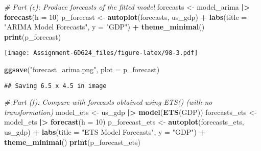 \documentclass[
]{article}
\newenvironment{Shaded}{\begin{snugshade}}{\end{snugshade}}
\newcommand{\AttributeTok}[1]{\textcolor[rgb]{0.13,0.29,0.53}{#1}}
\newcommand{\CommentTok}[1]{\textcolor[rgb]{0.56,0.35,0.01}{\textit{#1}}}
\newcommand{\DecValTok}[1]{\textcolor[rgb]{0.00,0.00,0.81}{#1}}
\newcommand{\FunctionTok}[1]{\textcolor[rgb]{0.13,0.29,0.53}{\textbf{#1}}}
\newcommand{\NormalTok}[1]{#1}
\newcommand{\OtherTok}[1]{\textcolor[rgb]{0.56,0.35,0.01}{#1}}
\newcommand{\SpecialCharTok}[1]{\textcolor[rgb]{0.81,0.36,0.00}{\textbf{#1}}}
\newcommand{\StringTok}[1]{\textcolor[rgb]{0.31,0.60,0.02}{#1}}
\begin{document}
\begin{Shaded}
\begin{Highlighting}[]
\CommentTok{\# Part (e): Produce forecasts of the fitted model}
\NormalTok{forecasts }\OtherTok{\textless{}{-}}\NormalTok{ model\_arima }\SpecialCharTok{|\textgreater{}} \FunctionTok{forecast}\NormalTok{(}\AttributeTok{h =} \DecValTok{10}\NormalTok{)}
\NormalTok{p\_forecast }\OtherTok{\textless{}{-}} \FunctionTok{autoplot}\NormalTok{(forecasts, us\_gdp) }\SpecialCharTok{+}
  \FunctionTok{labs}\NormalTok{(}\AttributeTok{title =} \StringTok{"ARIMA Model Forecasts"}\NormalTok{, }\AttributeTok{y =} \StringTok{"GDP"}\NormalTok{) }\SpecialCharTok{+}
  \FunctionTok{theme\_minimal}\NormalTok{()}
\FunctionTok{print}\NormalTok{(p\_forecast)}
\end{Highlighting}
\end{Shaded}

\texttt{[image: Assignment-6D624\_files/figure-latex/98-3.pdf]}

\begin{Shaded}
\begin{Highlighting}[]
\FunctionTok{ggsave}\NormalTok{(}\StringTok{"forecast\_arima.png"}\NormalTok{, }\AttributeTok{plot =}\NormalTok{ p\_forecast)}
\end{Highlighting}
\end{Shaded}

\begin{verbatim}
## Saving 6.5 x 4.5 in image
\end{verbatim}

\begin{Shaded}
\begin{Highlighting}[]
\CommentTok{\# Part (f): Compare with forecasts obtained using ETS() (with no transformation)}
\NormalTok{model\_ets }\OtherTok{\textless{}{-}}\NormalTok{ us\_gdp }\SpecialCharTok{|\textgreater{}} \FunctionTok{model}\NormalTok{(}\FunctionTok{ETS}\NormalTok{(GDP))}
\NormalTok{forecasts\_ets }\OtherTok{\textless{}{-}}\NormalTok{ model\_ets }\SpecialCharTok{|\textgreater{}} \FunctionTok{forecast}\NormalTok{(}\AttributeTok{h =} \DecValTok{10}\NormalTok{)}
\NormalTok{p\_forecast\_ets }\OtherTok{\textless{}{-}} \FunctionTok{autoplot}\NormalTok{(forecasts\_ets, us\_gdp) }\SpecialCharTok{+}
  \FunctionTok{labs}\NormalTok{(}\AttributeTok{title =} \StringTok{"ETS Model Forecasts"}\NormalTok{, }\AttributeTok{y =} \StringTok{"GDP"}\NormalTok{) }\SpecialCharTok{+}
  \FunctionTok{theme\_minimal}\NormalTok{()}
\FunctionTok{print}\NormalTok{(p\_forecast\_ets)}
\end{Highlighting}
\end{Shaded}
\end{document}
